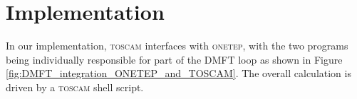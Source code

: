 \documentclass[10pt,a4paper,final]{article}
\begin{document}





%
%

\section{Implementation}
In our implementation, \textsc{toscam} interfaces with \textsc{onetep}, with the two programs being individually responsible for part of the DMFT loop as shown in Figure \ref{fig:DMFT_integration_ONETEP_and_TOSCAM}. The overall calculation is driven by a \textsc{toscam} shell script.
\end{document}
